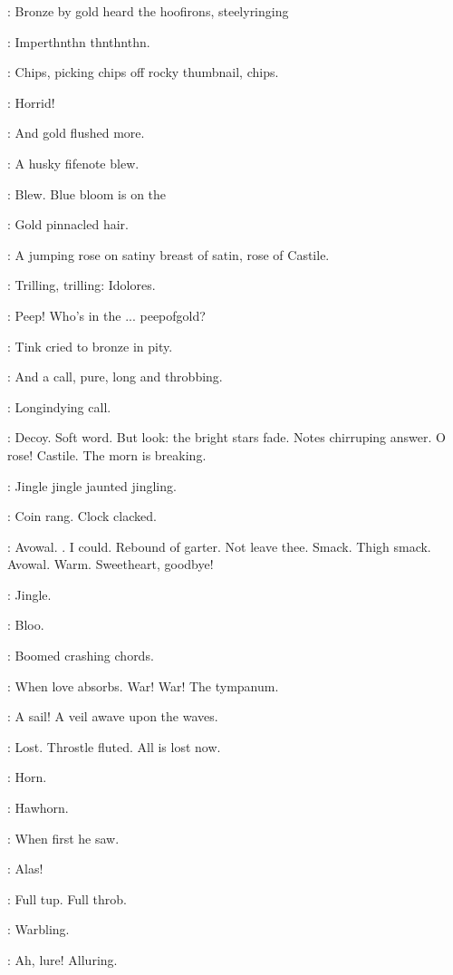 
:
Bronze by gold heard the hoofirons, steelyringing

\boots:
Imperthnthn thnthnthn.

\simon:
Chips, picking chips off rocky thumbnail, chips.

\MissK:
Horrid!

:
And gold flushed more.

:
A husky fifenote blew.

\BloomInt:
Blew.
Blue bloom is on the

:
Gold pinnacled hair.

\BloomInt:
A jumping rose on satiny breast of satin, rose of Castile.

\MissD:
Trilling, trilling: Idolores.

\lenehan:
Peep!
Who's in the ...
peepofgold?

:
Tink cried to bronze in pity.

:
And a call, pure, long and throbbing.

\BloomInt:
Longindying call.

\BloomInt:
Decoy.
Soft word.
But look: the bright stars fade.
Notes chirruping answer.
O rose!
Castile.
The morn is breaking.

\boylan:
Jingle jingle jaunted jingling.

\BloomInt:
Coin rang.
Clock clacked.

\lenehan:
Avowal.
.
I could.
Rebound of garter.
Not leave thee.
Smack.
Thigh smack.
Avowal.
Warm.
Sweetheart, goodbye!

\boylan:
Jingle.

\BloomInt:
Bloo.

:
Boomed crashing chords.

\BloomInt:
When love absorbs.
War!
War!
The tympanum.

\BloomInt:
A sail!
A veil awave upon the waves.

\BloomInt:
Lost.
Throstle fluted.
All is lost now.

\BloomInt:
Horn.

:
Hawhorn.

:
When first he saw.

\BloomInt:
Alas!

\BloomInt:
Full tup.
Full throb.

:
Warbling.

\BloomInt:
Ah, lure!
Alluring.

